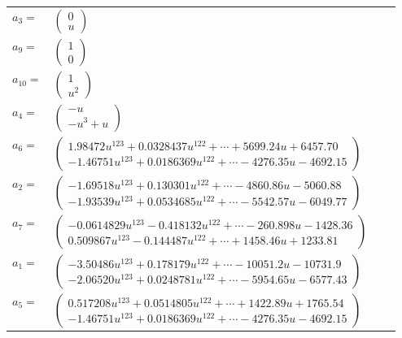 \documentclass[1p]{elsarticle_modified}
\theoremstyle{definition}
\begin{document}
\begin{tabular}{m{7pt} m{180pt} m{7pt} m{180pt} }
\flushright $a_{3}=$&$\begin{pmatrix}0\\u\end{pmatrix}$ \\
\flushright $a_{9}=$&$\begin{pmatrix}1\\0\end{pmatrix}$ \\
\flushright $a_{10}=$&$\begin{pmatrix}1\\u^2\end{pmatrix}$ \\
\flushright $a_{4}=$&$\begin{pmatrix}- u\\- u^3+u\end{pmatrix}$ \\
\flushright $a_{6}=$&$\begin{pmatrix}1.98472 u^{123}+0.0328437 u^{122}+\cdots+5699.24 u+6457.70\\-1.46751 u^{123}+0.0186369 u^{122}+\cdots-4276.35 u-4692.15\end{pmatrix}$ \\
\flushright $a_{2}=$&$\begin{pmatrix}-1.69518 u^{123}+0.130301 u^{122}+\cdots-4860.86 u-5060.88\\-1.93539 u^{123}+0.0534685 u^{122}+\cdots-5542.57 u-6049.77\end{pmatrix}$ \\
\flushright $a_{7}=$&$\begin{pmatrix}-0.0614829 u^{123}-0.418132 u^{122}+\cdots-260.898 u-1428.36\\0.509867 u^{123}-0.144487 u^{122}+\cdots+1458.46 u+1233.81\end{pmatrix}$ \\
\flushright $a_{1}=$&$\begin{pmatrix}-3.50486 u^{123}+0.178179 u^{122}+\cdots-10051.2 u-10731.9\\-2.06520 u^{123}+0.0248781 u^{122}+\cdots-5954.65 u-6577.43\end{pmatrix}$ \\
\flushright $a_{5}=$&$\begin{pmatrix}0.517208 u^{123}+0.0514805 u^{122}+\cdots+1422.89 u+1765.54\\-1.46751 u^{123}+0.0186369 u^{122}+\cdots-4276.35 u-4692.15\end{pmatrix}$ \\

\end{tabular}
\end{document}
